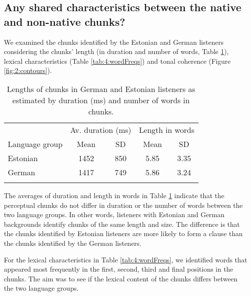\documentclass[output=paper]{langscibook}
\begin{document}
    \subsection{Any shared characteristics between the native and non-native chunks?}
    \largerpage

    We examined the chunks identified by the Estonian and German listeners considering the chunks’ length (in duration and number of words, Table \ref{tab:3:chunkDurs}), lexical characteristics (Table \ref{tab:4:wordFreqs}) and tonal coherence (Figure \ref{fig:2:contours}). %

    \begin{table}
	    \caption{Lengths of chunks in German and Estonian listeners as estimated by duration (ms) and number of words in chunks.}
	    \label{tab:3:chunkDurs}
		    \begin{tabular}{l *4{c}}
			    \lsptoprule
			                   & \multicolumn{2}{c}{Av. duration (ms)} & \multicolumn{2}{c}{Length in words} \\\cmidrule(lr){2-3}\cmidrule(lr){4-5}
			    Language group & Mean & SD & Mean & SD \\   \midrule
			    Estonian & 1452 & 850 & 5.85 & 3.35\\
			    German   & 1417 & 749 & 5.86 & 3.24\\
			    \lspbottomrule
		    \end{tabular}
    \end{table}

    The averages of duration and length in words in Table \ref{tab:3:chunkDurs} indicate that the perceptual chunks do not differ in duration or the number of words between the two language groups. In other words, listeners with Estonian and German backgrounds identify chunks of the same length and size. The difference is that the chunks identified by Estonian listeners are more likely to form a clause than the chunks identified by the German listeners.

    For the lexical characteristics in Table \ref{tab:4:wordFreqs}, we identified words that appeared most frequently in the first, second, third and final positions in the chunks. The aim was to see if the lexical content of the chunks differs between the two language groups.
\end{document}
